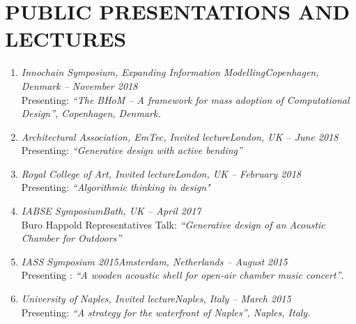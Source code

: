 \section*{PUBLIC PRESENTATIONS AND LECTURES}
    \begin{enumerate}[leftmargin=0.45cm, itemsep=0em, topsep=0.5em, parsep=0.2em]
        \item \emph{Innochain Symposium, Expanding Information Modelling}\hfill            \textit{Copenhagen, Denmark -- November 2018} \\
            Presenting: \textit{“The BHoM – A framework for mass adoption of Computational Design”, Copenhagen, Denmark.}

        \item \emph{Architectural Association, EmTec, Invited lecture}\hfill             \textit{London, UK -- June 2018} \\
            Presenting: \textit{“Generative design with active bending”}

        \item \emph{Royal College of Art, Invited lecture}\hfill \textit{London, UK -- February 2018} \\
            Presenting: \textit{“Algorithmic thinking in design"}

        \item \emph{IABSE Symposium}\hfill \textit{Bath, UK -- April 2017} \\
            Buro Happold Representatives Talk: \textit{“Generative design of an Acoustic Chamber for Outdoors”}

        \item \emph{IASS Symposium 2015}\hfill \textit{Amsterdam, Netherlands -- August 2015} \\
        Presenting : \textit{“A wooden acoustic shell for open-air chamber music concert”}.

        \item \emph{University of Naples, Invited lecture}\hfill \textit{Naples, Italy -- March 2015} \\
    	Presenting: \textit{“A strategy for the waterfront of Naples”, Naples, Italy.}

    \end{enumerate}
